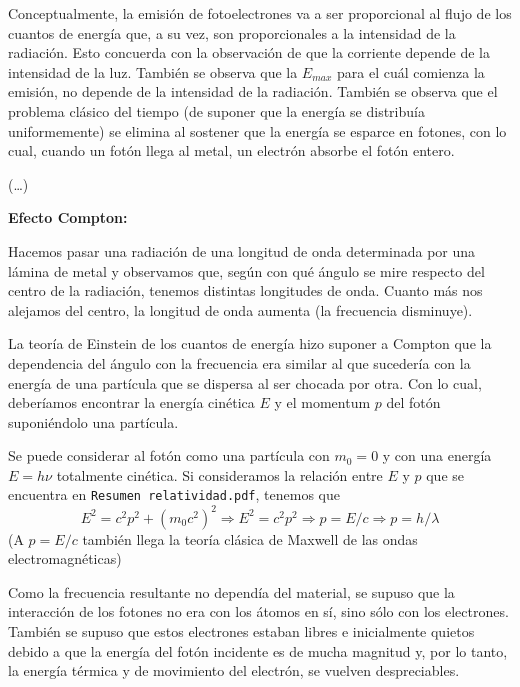 \documentclass{article}
\begin{document}
Conceptualmente, la emisión de fotoelectrones va a ser proporcional al flujo de los cuantos de energía que, a su vez, son proporcionales a la intensidad de la radiación. Esto concuerda con la observación de que la corriente depende de la intensidad de la luz. También se observa que la $E_{max}$ para el cuál comienza la emisión, no depende de la intensidad de la radiación. También se observa que el problema clásico del tiempo (de suponer que la energía se distribuía uniformemente) se elimina al sostener que la energía se esparce en fotones, con lo cual, cuando un fotón llega al metal, un electrón absorbe el fotón entero.

(\ldots)

\textbf{Efecto Compton:}

Hacemos pasar una radiación de una longitud de onda determinada por una lámina de metal y observamos que, según con qué ángulo se mire respecto del centro de la radiación, tenemos distintas longitudes de onda. Cuanto más nos alejamos del centro, la longitud de onda aumenta (la frecuencia disminuye).

La teoría de Einstein de los cuantos de energía hizo suponer a Compton que la dependencia del ángulo con la frecuencia era similar al que sucedería con la energía de una partícula que se dispersa al ser chocada por otra. Con lo cual, deberíamos encontrar la energía cinética $E$ y el momentum $p$ del fotón suponiéndolo una partícula.

Se puede considerar al fotón como una partícula con $m_{0}=0$ y con una energía $E=h \nu$ totalmente cinética. Si consideramos la relación entre $E$ y $p$ que se encuentra en \texttt{Resumen relatividad.pdf}, tenemos que
\[ E^{2}=c^{2}p^{2}+(m_{0}c^{2})^{2} \Longrightarrow E^{2}=c^{2}p^{2} \Longrightarrow p=E/c \Longrightarrow p=h/ \lambda \]
(A $p=E/c$ también llega la teoría clásica de Maxwell de las ondas electromagnéticas)

Como la frecuencia resultante no dependía del material, se supuso que la interacción de los fotones no era con los átomos en sí, sino sólo con los electrones. También se supuso que estos electrones estaban libres e inicialmente quietos debido a que la energía del fotón incidente es de mucha magnitud y, por lo tanto, la energía térmica y de movimiento del electrón, se vuelven despreciables.
\end{document}
